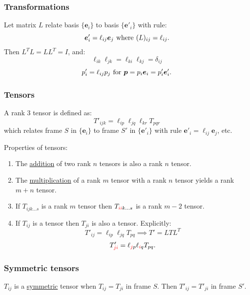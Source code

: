 \documentclass{article}
\begin{document}
\begin{multicols*}{3}
\subsubsection*{Transformations}
Let matrix $L$ relate
basis $\{\boldsymbol{e}_i\}$ to basis
$\{\boldsymbol{e}'_i\}$ with rule:
$$\boldsymbol{e}'_i
=\ell_{ij}\boldsymbol{e}_j
\hspace{0.05in}\text{where}\hspace{0.05in}
(L)_{ij}=\ell_{ij}.$$
Then $L^T L=LL^T=I$, and:
$$\ell_{ik}\ell_{jk}
=\ell_{ki}\ell_{kj}=\delta_{ij}$$
$$p'_i=\ell_{ij}p_j
\hspace{0.05in}\text{for}\hspace{0.05in}
\boldsymbol{p}=p_i\boldsymbol{e}_i
=p'_i\boldsymbol{e}'_i.$$

\subsubsection*{Tensors}
A rank $3$ tensor is defined as:
$$T'_{ijk}=\ell_{ip}\ell_{jq}\ell_{kr}T_{pqr}$$
which relates frame $S$ in $\{\boldsymbol{e}_i\}$ to
frame $S'$ in $\{\boldsymbol{e}'_i\}$ with
rule $\boldsymbol{e}'_i=\ell_{ij}\boldsymbol{e}_j$, etc.

Properties of tensors:
\begin{enumerate}
    \item The \underline{addition} of two rank
    $n$ tensors is also a rank $n$ tensor.
    
    \item The \underline{multiplication} of a
    rank $m$ tensor with a rank $n$ tensor yields
    a rank $m+n$ tensor.

    \item If $T_{ijk\dots s}$ is a rank $m$ tensor
    then $T_{\textcolor{red}{ii}k\dots s}$ is a rank $m-2$ tensor.

    \item If $T_{ij}$ is a tensor then
    $T_{ji}$ is also a tensor. Explicitly:
    $$T'_{ij}=\ell_{ip}\ell_{jq}T_{pq}
    \implies T'=LTL^T$$
    $$T'_{\textcolor{red}{ji}}=\ell_{\textcolor{red}{j}p}
    \ell_{\textcolor{red}{i}q}T_{pq}.$$
\end{enumerate}

\subsubsection*{Symmetric tensors}
$T_{ij}$ is a \underline{symmetric} tensor
when $T_{ij}=T_{ji}$ in frame $S$.
Then $T'_{ij}=T'_{ji}$ in frame $S'$.


\end{multicols*}
\end{document}
